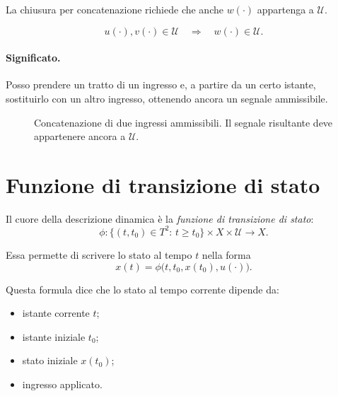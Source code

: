 La chiusura per concatenazione richiede che anche $w(\cdot)$ appartenga a $\mathcal{U}$.

\[
u(\cdot),v(\cdot)\in\mathcal{U}
\quad \Longrightarrow \quad
w(\cdot)\in\mathcal{U}.
\]

\paragraph{Significato.}
Posso prendere un tratto di un ingresso e, a partire da un certo istante, sostituirlo con un altro ingresso, ottenendo ancora un segnale ammissibile.

\begin{figure}[H]
\centering
{}
\caption{Concatenazione di due ingressi ammissibili. Il segnale risultante deve appartenere ancora a $\mathcal{U}$.}
\end{figure}

\section{Funzione di transizione di stato}

Il cuore della descrizione dinamica è la \emph{funzione di transizione di stato}:
\[
\phi:\{(t,t_0)\in T^2:\, t\ge t_0\}\times X\times \mathcal{U}\to X.
\]

Essa permette di scrivere lo stato al tempo $t$ nella forma
\[
x(t)=\phi\bigl(t,t_0,x(t_0),u(\cdot)\bigr).
\]

Questa formula dice che lo stato al tempo corrente dipende da:
\begin{itemize}
    \item istante corrente $t$;
    \item istante iniziale $t_0$;
    \item stato iniziale $x(t_0)$;
    \item ingresso applicato.
\end{itemize}

